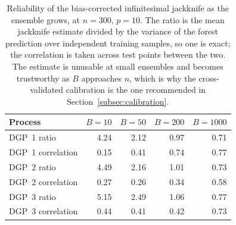 \begin{table}[htbp]
\centering
\caption{Reliability of the bias-corrected infinitesimal jackknife as the ensemble grows, at $n=300$, $p=10$. The ratio is the mean jackknife estimate divided by the variance of the forest prediction over independent training samples, so one is exact; the correlation is taken across test points between the two. The estimate is unusable at small ensembles and becomes trustworthy as $B$ approaches $n$, which is why the cross-validated calibration is the one recommended in Section~\ref{subsec:calibration}.}
\label{tab:ij}
\small
\setlength{\tabcolsep}{4pt}
\begin{tabular}{lrrrr}
\toprule
Process & $B{=}10$ & $B{=}50$ & $B{=}200$ & $B{=}1000$ \\
\midrule
DGP~1 ratio & 4.24 & 2.12 & 0.97 & 0.71 \\
DGP~1 correlation & 0.15 & 0.41 & 0.74 & 0.77 \\
DGP~2 ratio & 4.49 & 2.16 & 1.01 & 0.73 \\
DGP~2 correlation & 0.27 & 0.26 & 0.34 & 0.58 \\
DGP~3 ratio & 5.15 & 2.49 & 1.06 & 0.77 \\
DGP~3 correlation & 0.44 & 0.41 & 0.42 & 0.73 \\
\bottomrule
\end{tabular}
\end{table}
